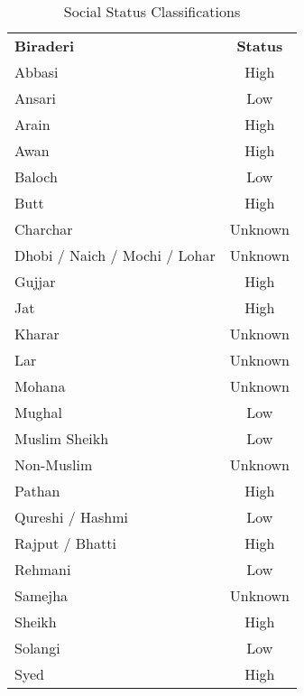 \documentclass[Eubank_pk_ethnic_sorting.tex]{subfiles}
\begin{document}
\begin{table}[h]
\centering
\caption{Social Status Classifications}
\label{appendix_classification_table}
\begin{tabular}{lc}
\textbf{Biraderi}             & \textbf{Status}\\
Abbasi                        & High  			\\
Ansari                        & Low   			\\
Arain                         & High  			\\
Awan                          & High  			\\
Baloch                        & Low   			\\
Butt                          & High  			\\
Charchar                      & Unknown    		\\	
Dhobi / Naich / Mochi / Lohar & Unknown    		\\	
Gujjar                        & High  			\\
Jat                           & High  			\\
Kharar                        & Unknown    		\\	
Lar                           & Unknown    		\\	
Mohana                        & Unknown    		\\	
Mughal                        & Low   			\\
Muslim Sheikh                 & Low   			\\
Non-Muslim					  & Unknown    		\\	
Pathan                        & High  			\\
Qureshi / Hashmi              & Low   			\\
Rajput / Bhatti               & High  			\\
Rehmani                       & Low   			\\
Samejha                       & Unknown    		\\	
Sheikh                        & High  			\\
Solangi                       & Low   			\\
Syed                          & High  			\\
\end{tabular}
\end{table}
\end{document}
